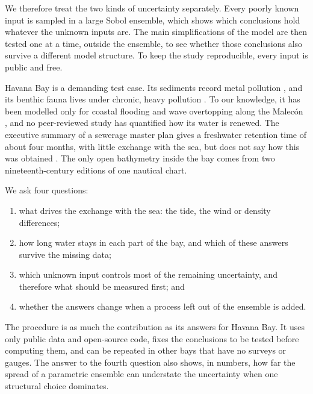 \documentclass[a4paper,fleqn]{ems-dc}
\begin{document}
We therefore treat the two kinds of uncertainty separately. Every poorly known input is
sampled in a large Sobol ensemble, which shows which conclusions hold whatever the unknown
inputs are. The main simplifications of the model are then tested one at a time, outside the
ensemble, to see whether those conclusions also survive a different model structure. To keep
the study reproducible, every input is public and free.

Havana Bay is a demanding test case. Its sediments record metal pollution
\citep{DiazAsencio2011}, and its benthic fauna lives under chronic, heavy pollution
\citep{Armenteros2009}. To our knowledge, it has been modelled only for coastal flooding
and wave overtopping along the Malec\'on \citep{PoncePortela2016,CordovaDeHorta2025}, and
no peer-reviewed study has quantified how its water is renewed. The executive summary of a
sewerage master plan gives a freshwater retention time of about four months, with little
exchange with the sea, but does not say how this was obtained \citep{JICA2004}. The only
open bathymetry inside the bay comes from two nineteenth-century editions of one nautical
chart.

We ask four questions:

\begin{enumerate}[label=(\arabic*),leftmargin=2.2em,itemsep=0pt]
\item what drives the exchange with the sea: the tide, the wind or density differences;
\item how long water stays in each part of the bay, and which of these answers survive the
missing data;
\item which unknown input controls most of the remaining uncertainty, and therefore what
should be measured first; and
\item whether the answers change when a process left out of the ensemble is added.
\end{enumerate}

\noindent The procedure is as much the contribution as its answers for Havana Bay. It uses
only public data and open-source code, fixes the conclusions to be tested before computing
them, and can be repeated in other bays that have no surveys or gauges. The answer to the
fourth question also shows, in numbers, how far the spread of a parametric ensemble can
understate the uncertainty when one structural choice dominates.

\end{document}
